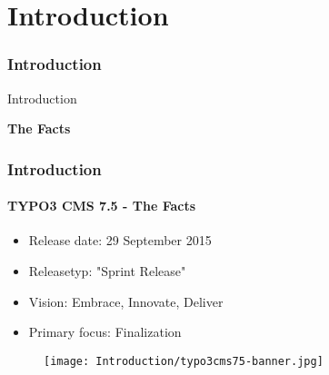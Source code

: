 %

\section{Introduction}
\begin{frame}[fragile]
	\frametitle{Introduction}

	\begin{center}\huge{Introduction}\end{center}
	\begin{center}\huge{\color{typo3darkgrey}\textbf{The Facts}}\end{center}

\end{frame}

\begin{frame}[fragile]
	\frametitle{Introduction}
	\framesubtitle{TYPO3 CMS 7.5 - The Facts}

	\begin{itemize}
		\item Release date: 29 September 2015
		\item Releasetyp: "Sprint Release"
		\item Vision: Embrace, Innovate, Deliver
		\item Primary focus: Finalization
	\end{itemize}

	\begin{figure}
		\texttt{[image: Introduction/typo3cms75-banner.jpg]}
	\end{figure}

\end{frame}

